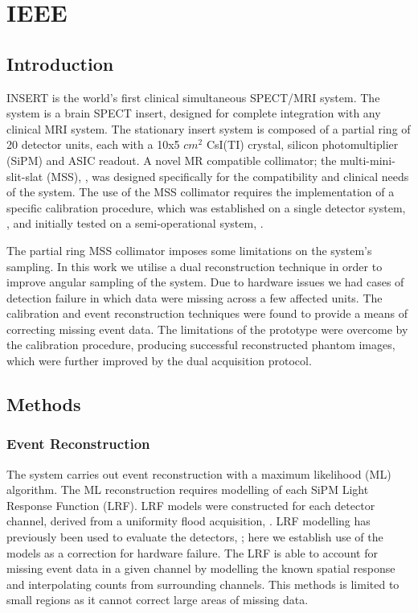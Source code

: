 \chapter{IEEE}
\label{chapterlabel3}


\section{Introduction}

INSERT is the world's first clinical simultaneous SPECT/MRI system. The system is a brain SPECT insert, designed for complete integration with any clinical MRI system. The stationary insert system is composed of a partial ring of 20 detector units, each with a 10x5 $cm^2$ CsI(TI) crystal, silicon photomultiplier (SiPM) and ASIC readout. A novel MR compatible collimator; the multi-mini-slit-slat (MSS), \cite{7430894}, was designed specifically for the compatibility and clinical needs of the system. The use of the MSS collimator requires the implementation of a specific calibration procedure, which was established on a single detector system, \cite{8340862}, and initially tested on a semi-operational system, \cite{inproceedings}.

The partial ring MSS collimator imposes some limitations on the system's sampling. In this work we utilise a dual reconstruction technique in order to improve angular sampling of the system. Due to hardware issues we had cases of detection failure in which data were missing across a few affected units. The calibration and event reconstruction techniques were found to provide a means of correcting missing event data. The limitations of the prototype were overcome by the calibration procedure, producing successful reconstructed phantom images, which were further improved by the dual acquisition protocol.   

\section{Methods}

\subsection{Event Reconstruction}
The system carries out event reconstruction with a maximum likelihood (ML) algorithm. The ML reconstruction requires modelling of each SiPM Light Response Function (LRF). LRF models were constructed for each detector channel, derived from a uniformity flood acquisition, \cite{6359814}. LRF modelling has previously been used to evaluate the detectors, \cite{8069405}; here we establish use of the models as a correction for hardware failure. The LRF is able to account for missing event data in a given channel by modelling the known spatial response and interpolating counts from surrounding channels. This methods is limited to small regions as it cannot correct large areas of missing data. 


